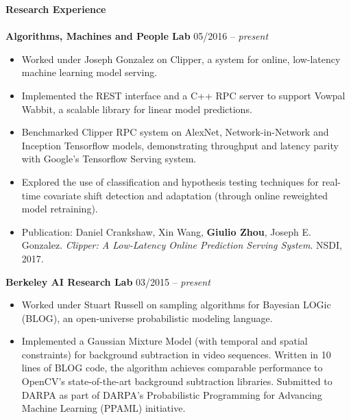 \documentclass{article}
\begin{document}
\noindent
\textbf{{\Large Research Experience}}\\[-2mm]
\HRule\\
\noindent
\textbf{Algorithms, Machines and People Lab}
\hfill 05/2016 -- \textit{present}
\begin{itemize}
\vspace{-2.5mm}
\item Worked under Joseph Gonzalez on Clipper, a system for online, low-latency machine learning model serving.
\vspace{-2.5mm}
\item Implemented the REST interface and a C++ RPC server to support Vowpal Wabbit, a scalable library for linear model predictions.
\vspace{-2.5mm}
\item Benchmarked Clipper RPC system on AlexNet, Network-in-Network and Inception Tensorflow models, demonstrating throughput and latency parity with Google's Tensorflow Serving system.
\vspace{-2.5mm}
\item Explored the use of classification and hypothesis testing techniques for real-time covariate shift detection and adaptation (through online reweighted model retraining).
\vspace{-2.5mm}
\item Publication: Daniel Crankshaw, Xin Wang, \textbf{Giulio Zhou}, Joseph E. Gonzalez. \textit{Clipper: A Low-Latency Online Prediction Serving System}. NSDI, 2017.
\end{itemize}
\vspace{-2mm}

\noindent
\textbf{Berkeley AI Research Lab}
\hfill 03/2015 -- \textit{present}
\begin{itemize}
\vspace{-2.5mm}
\item Worked under Stuart Russell on sampling algorithms for Bayesian LOGic (BLOG), an open-universe probabilistic modeling language.
\vspace{-2.5mm}
\item Implemented a Gaussian Mixture Model (with temporal and spatial constraints) for background subtraction in video sequences. Written in 10 lines of BLOG code, the algorithm achieves comparable performance to OpenCV's state-of-the-art background subtraction libraries. Submitted to DARPA as part of DARPA's Probabilistic Programming for Advancing Machine Learning (PPAML) initiative.
\end{itemize}
\end{document}
